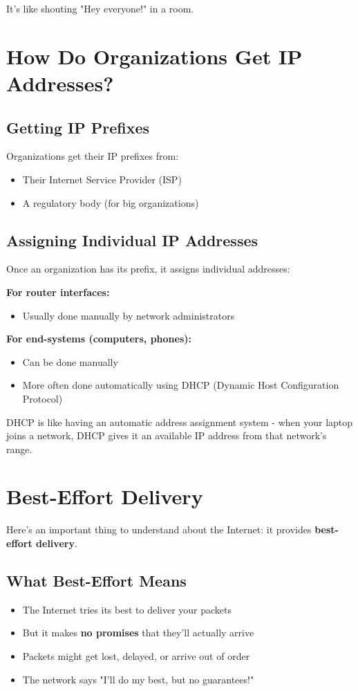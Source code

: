 \documentclass[../../compsys.tex]{subfiles}
\begin{document}
It's like shouting "Hey everyone!" in a room.

\section{How Do Organizations Get IP Addresses?}
\subsection{Getting IP Prefixes}
Organizations get their IP prefixes from:
\begin{itemize}
    \item Their Internet Service Provider (ISP)
    \item A regulatory body (for big organizations)
\end{itemize}

\subsection{Assigning Individual IP Addresses}
Once an organization has its prefix, it assigns individual addresses:

\textbf{For router interfaces:}
\begin{itemize}
    \item Usually done manually by network administrators
\end{itemize}

\textbf{For end-systems (computers, phones):}
\begin{itemize}
    \item Can be done manually
    \item More often done automatically using DHCP (Dynamic Host Configuration Protocol)
\end{itemize}

DHCP is like having an automatic address assignment system - when your laptop joins a network, DHCP gives it an available IP address from that network's range.

\newpage

\section{Best-Effort Delivery}
Here's an important thing to understand about the Internet: it provides \textbf{best-effort delivery}.

\subsection{What Best-Effort Means}
\begin{itemize}
    \item The Internet tries its best to deliver your packets
    \item But it makes \textbf{no promises} that they'll actually arrive
    \item Packets might get lost, delayed, or arrive out of order
    \item The network says "I'll do my best, but no guarantees!"
\end{itemize}
\end{document}
